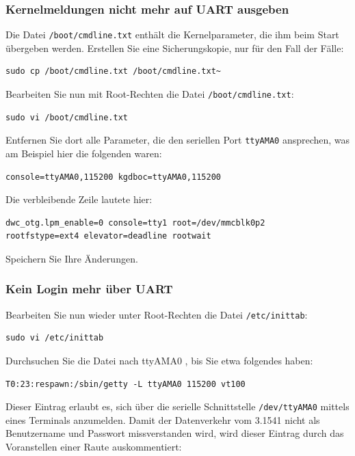 \documentclass[10pt,a4paper]{scrartcl}		%
\begin{document}
\subsubsection*{Kernelmeldungen nicht mehr auf UART ausgeben}
Die Datei \texttt{/boot/cmdline.txt} enthält die Kernelparameter, die ihm
beim Start übergeben werden.  
Erstellen Sie eine Sicherungskopie, nur für den Fall der Fälle:

\begin{verbatim}
sudo cp /boot/cmdline.txt /boot/cmdline.txt~
\end{verbatim}

Bearbeiten Sie nun mit Root-Rechten die Datei \texttt{/boot/cmdline.txt}:

\begin{verbatim}
sudo vi /boot/cmdline.txt
\end{verbatim}

Entfernen Sie dort alle Parameter, die den seriellen Port \texttt{ttyAMA0}
ansprechen, was am Beispiel hier die folgenden waren:

\begin{verbatim}
console=ttyAMA0,115200 kgdboc=ttyAMA0,115200
\end{verbatim}

Die verbleibende Zeile lautete hier:
\begin{verbatim}
dwc_otg.lpm_enable=0 console=tty1 root=/dev/mmcblk0p2 
rootfstype=ext4 elevator=deadline rootwait
\end{verbatim}

Speichern Sie Ihre Änderungen.

\subsubsection*{Kein Login mehr über UART}
Bearbeiten Sie nun wieder unter
Root-Rechten die Datei \texttt{/etc/inittab}:

\begin{verbatim}
sudo vi /etc/inittab
\end{verbatim}

Durchsuchen Sie die Datei nach \glqq{}ttyAMA0 \grqq{}, bis Sie 
etwa folgendes haben:

\begin{verbatim}
T0:23:respawn:/sbin/getty -L ttyAMA0 115200 vt100
\end{verbatim}

Dieser Eintrag erlaubt es, sich über die serielle Schnittstelle
\texttt{/dev/ttyAMA0} mittels eines Terminals anzumelden.
Damit der Datenverkehr vom 3.1541 nicht als Benutzername und Passwort
missverstanden wird, wird dieser Eintrag durch das Voranstellen einer Raute
auskommentiert:
\end{document}
